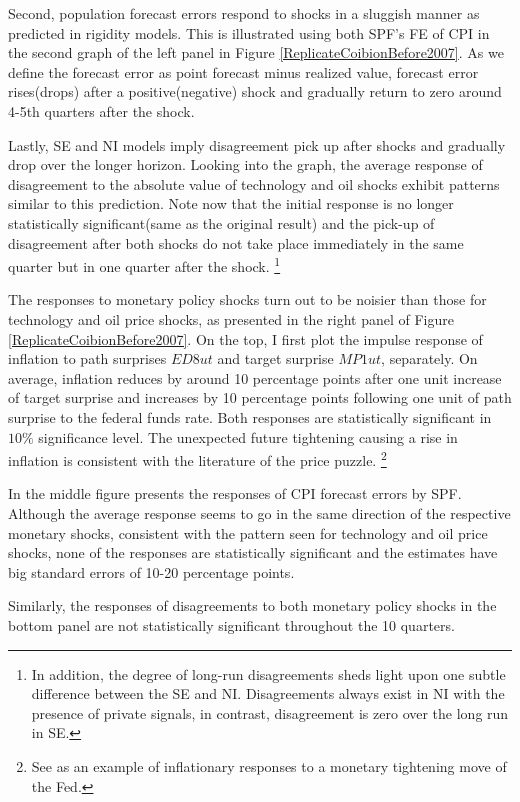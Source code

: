 \documentclass[12pt]{article}
\begin{document}
	Second, population forecast errors respond to shocks in a sluggish manner as predicted in rigidity models. This is illustrated using both SPF's FE of CPI in the second graph of the left panel in Figure \ref{ReplicateCoibionBefore2007}. As we define the forecast error as point forecast minus realized value, forecast error rises(drops) after a positive(negative) shock and gradually return to zero around 4-5th quarters after the shock. 
	
	Lastly, SE and NI models imply disagreement pick up after shocks and gradually drop over the longer horizon.  Looking into the graph, the average response of disagreement to the absolute value of technology and oil shocks exhibit patterns similar to this prediction. Note now that the initial response is no longer statistically significant(same as the original result) and the pick-up of disagreement after both shocks do not take place immediately in the same quarter but in one quarter after the shock. \footnote{In addition, the degree of long-run disagreements sheds light upon one subtle difference between the SE and NI. Disagreements always exist in NI with the presence of private signals, in contrast, disagreement is zero over the long run in SE. }
	
	The responses to monetary policy shocks turn out to be noisier than those for technology and oil price shocks, as presented in the right panel of Figure \ref{ReplicateCoibionBefore2007}. On the top, I first plot the impulse response of inflation to path surprises $ED8ut$ and target surprise $MP1ut$, separately. On average, inflation reduces by around 10 percentage points after one unit increase of target surprise and increases by 10 percentage points following one unit of path surprise to the federal funds rate. Both responses are  statistically significant in $10\%$  significance level. The unexpected future tightening causing a rise in inflation is consistent with the literature of the price puzzle. \footnote{See \cite{nakamura2018high} as an example of inflationary responses to a monetary tightening move of the Fed.}
	
	In the middle figure presents the responses of CPI forecast errors by SPF.  Although the average response seems to go in the same direction of the respective monetary shocks, consistent with the pattern seen for technology and oil price shocks, none of the responses are statistically significant and the estimates have big standard errors of 10-20 percentage points.  
	
	Similarly, the responses of disagreements to both monetary policy shocks in the bottom panel are not statistically significant throughout the 10 quarters.  
	
\end{document}
